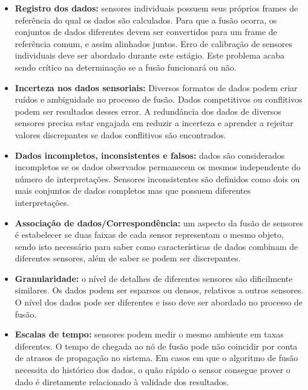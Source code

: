 \documentclass[acronym, symbols, table]{fei}
\begin{document}
			\begin{itemize}
				\item \textbf{Registro dos dados:} sensores individuais possuem seus próprios frames de referência do qual os dados são calculados. Para que a fusão ocorra, os conjuntos de dados diferentes devem ser convertidos para um frame de referência comum, e assim alinhados juntos. Erro de calibração de sensores individuais deve ser abordado durante este estágio. Este problema acaba sendo crítico na determinação se a fusão funcionará ou não.
				
				\item \textbf{Incerteza nos dados sensoriais:} Diversos formatos de dados podem criar ruídos e ambiguidade no processo de fusão. Dados competitivos ou conflitivos podem ser resultados desses error. A redundância dos dados de diversos sensores precisa estar engajada em reduzir a incerteza e aprender a rejeitar valores discrepantes se dados conflitivos são encontrados.
				
				\item \textbf{Dados incompletos, inconsistentes e falsos:} dados são considerados incompletos se os dados observados permanecem os mesmos independente do número de interpretações. Sensores inconsistentes são definidos como dois ou mais conjuntos de dados completos mas que possuem diferentes interpretações.
				
				\item \textbf{Associação de dados/Correspondência:} um aspecto da fusão de sensores é estabelecer se duas faixas de cada sensor representam o mesmo objeto, sendo isto necessário para saber como características de dados combinam de diferentes sensores, além de saber se podem ser discrepantes. 
				
				\item \textbf{Granularidade:} o nível de detalhes de diferentes sensores são dificilmente similares. Os dados podem ser esparsos ou densos, relativos a outros sensores. O nível dos dados pode ser diferentes e isso deve ser abordado no processo de fusão.
				
				\item \textbf{Escalas de tempo:} sensores podem medir o mesmo ambiente em taxas diferentes. O tempo de chegada ao nó de fusão pode não coincidir por conta de atrasos de propagação no sistema. Em casos em que o algoritmo de fusão necessita do histórico dos dados, o quão rápido o sensor consegue prover o dado é diretamente relacionado à validade dos resultados.
			\end{itemize}
		
\end{document}
